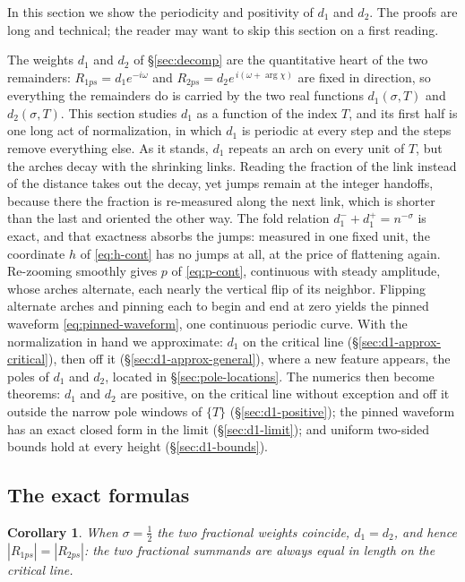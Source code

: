 \documentclass[11pt]{article}
\newtheorem{corollary}[theorem]{Corollary}
\theoremstyle{definition}
\begin{document}
In this section we show the periodicity and positivity of $d_1$ and
$d_2$. The proofs are long and technical; the reader may want to skip
this section on a first reading.

The weights $d_1$ and $d_2$ of \S\ref{sec:decomp} are the quantitative heart
of the two remainders: $R_{1ps}=d_1e^{-i\omega}$ and
$R_{2ps}=d_2e^{\,i(\omega+\arg\chi)}$ are fixed in direction, so everything
the remainders do is carried by the two real functions
$d_1(\sigma,T)$ and $d_2(\sigma,T)$. This section studies $d_1$ as a
function of the index $T$, and its first half is one long act of
normalization, in which $d_1$ is periodic at every step and the steps
remove everything else. As it stands, $d_1$ repeats an arch on every unit
of $T$, but the arches decay with the shrinking links. Reading the
fraction of the link instead of the distance takes out the decay, yet
jumps remain at the integer handoffs, because there the fraction is
re-measured along the next link, which is shorter than the last and
oriented the other way. The fold relation $d_1^-+d_1^+=n^{-\sigma}$ is
exact, and that exactness absorbs the jumps: measured in one fixed unit,
the coordinate $h$ of \eqref{eq:h-cont} has no jumps at all, at the price
of flattening again. Re-zooming smoothly gives $p$ of \eqref{eq:p-cont},
continuous with steady amplitude, whose arches alternate, each nearly the
vertical flip of its neighbor. Flipping alternate arches and pinning each
to begin and end at zero yields the pinned waveform
\eqref{eq:pinned-waveform}, one continuous periodic curve. With the
normalization in hand we approximate: $d_1$ on the critical line
(\S\ref{sec:d1-approx-critical}), then off it
(\S\ref{sec:d1-approx-general}), where a new feature appears, the poles of
$d_1$ and $d_2$, located in \S\ref{sec:pole-locations}. The numerics then
become theorems: $d_1$ and $d_2$ are positive, on the critical line
without exception and off it outside the narrow pole windows of $\{T\}$
(\S\ref{sec:d1-positive}); the pinned waveform has an exact closed form in
the limit (\S\ref{sec:d1-limit}); and uniform two-sided bounds hold at
every height (\S\ref{sec:d1-bounds}).

\subsection{The exact formulas}\label{sec:d1-exact}

\begin{corollary}\label{cor:equal}
When $\sigma=\tfrac12$ the two fractional weights coincide, $d_1=d_2$, and
hence $|R_{1ps}| = |R_{2ps}|$: the two fractional summands are always equal
in length on the critical line.
\end{corollary}
\end{document}
